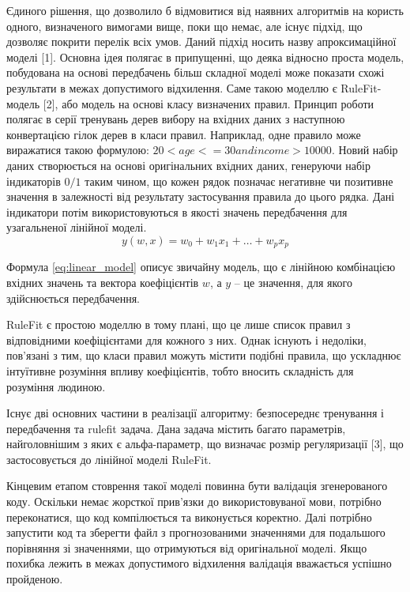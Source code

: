 Єдиного рішення, що дозволило б відмовитися від наявних алгоритмів на користь одного, визначеного вимогами вище, поки що немає, але існує підхід, що дозволяє покрити перелік всіх умов. Даний підхід носить назву апроксимаційної моделі [1]. Основна ідея полягає в припущенні, що деяка відносно проста модель, побудована на основі передбачень більш складної моделі може показати схожі результати в межах допустимого відхилення. Саме такою моделлю є RuleFit-модель [2], або модель на основі класу визначених правил. Принцип роботи полягає в серії тренувань дерев вибору на вхідних даних з наступною конвертацією гілок дерев в класи правил. Наприклад, одне правило може виражатися такою формулою: $20 < age <= 30 and income > 10000$. Новий набір даних створюється на основі оригінальних вхідних даних, генеруючи набір індикаторів $0/1$ таким чином, що кожен рядок позначає негативне чи позитивне значення в залежності від результату застосування правила до цього рядка. Дані індикатори потім використовуються в якості значень передбачення для узагальненої лінійної моделі.
\begin{equation}
    \label{eq:linear_model}
    y(w, x) = w_{0} + w_{1}x_{1} + \ldots + w_{p}x_{p}
\end{equation}

Формула \ref{eq:linear_model} описує звичайну модель, що є лінійною комбінацією вхідних значень та вектора коефіцієнтів $w$, а  $y$ – це значення, для якого здійснюється передбачення.

RuleFit є простою моделлю в тому плані, що це лише список правил з відповідними коефіцієнтами для кожного з них. Однак існують і недоліки, пов'язані з тим, що класи правил можуть містити подібні правила, що ускладнює інтуїтивне розуміння впливу коефіцієнтів, тобто вносить складність для розуміння людиною.

Існує дві основних частини в реалізації алгоритму: безпосереднє тренування і передбачення та rulefit задача. Дана задача містить багато параметрів, найголовнішим з яких є альфа-параметр, що визначає розмір регуляризації [3], що застосовується до лінійної моделі RuleFit.

Кінцевим етапом стоврення такої моделі повинна бути валідація згенерованого коду. Оскільки немає жорсткої прив’язки до використовуваної мови, потрібно переконатися, що код компілюється та виконується коректно. Далі потрібно запустити код та зберегти файл з прогнозованими значеннями для подальшого порівняння зі значеннями, що отримуються від оригінальної моделі. Якщо похибка лежить в межах допустимого відхилення валідація вважається успішно пройденою.

